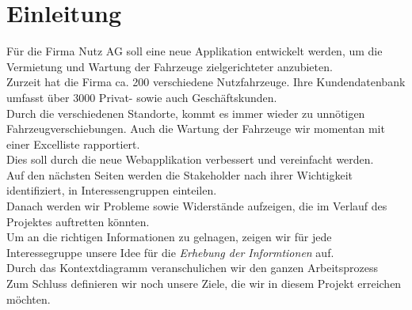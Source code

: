 \section{Einleitung}
Für die Firma Nutz AG soll eine neue Applikation entwickelt werden, um die Vermietung und Wartung der Fahrzeuge zielgerichteter anzubieten.\\
Zurzeit hat die Firma ca. 200 verschiedene Nutzfahrzeuge. Ihre Kundendatenbank umfasst über 3000 Privat- sowie auch Geschäftskunden.\\
Durch die verschiedenen Standorte, kommt es immer wieder zu unnötigen Fahrzeugverschiebungen. Auch die Wartung der Fahrzeuge wir momentan mit einer Excelliste rapportiert.\\[2ex]
%
Dies soll durch die neue Webapplikation verbessert und vereinfacht werden.\\
Auf den nächsten Seiten werden die Stakeholder nach ihrer Wichtigkeit identifiziert, in Interessengruppen einteilen.\\
Danach werden wir Probleme sowie Widerstände aufzeigen, die im Verlauf des Projektes auftretten könnten.\\
Um an die richtigen Informationen zu gelnagen, zeigen wir für jede Interessegruppe unsere Idee für die \textit{Erhebung der Informtionen} auf.\\
Durch das Kontextdiagramm veranschulichen wir den ganzen Arbeitsprozess\\
Zum Schluss definieren wir noch unsere Ziele, die wir in diesem Projekt erreichen möchten.